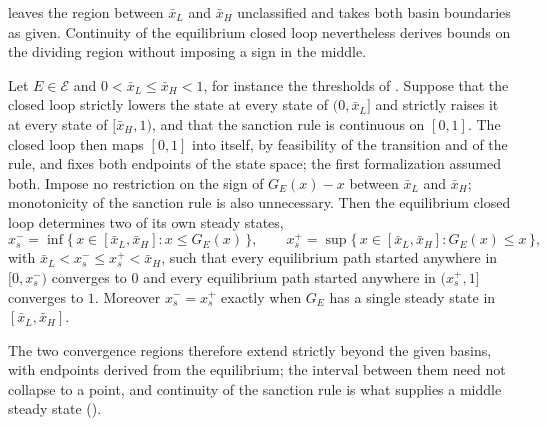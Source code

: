  leaves the region between $\bar x_L$ and
$\bar x_H$ unclassified and takes both basin boundaries as given. Continuity of
the equilibrium closed loop nevertheless derives bounds on the dividing region
without imposing a sign in the middle.

\begin{proposition}
\label{prop:derived-dividing-line}
Let $E\in\mathcal E$ and $0<\bar x_L\le\bar x_H<1$, for instance the thresholds
of . Suppose that the closed loop strictly
lowers the state at every state of $(0,\bar x_L]$ and strictly raises it at
every state of $[\bar x_H,1)$, and that the sanction rule is continuous on
$[0,1]$. The closed loop then maps $[0,1]$ into itself, by feasibility of the
transition and of the rule, and fixes both endpoints of the state space; the
first formalization assumed both. Impose no restriction on the sign
of $G_E(x)-x$ between $\bar x_L$ and $\bar x_H$; monotonicity of the sanction
rule is also unnecessary. Then the equilibrium
closed loop determines two of its own steady states,
\[
  x_s^-=\inf\{\,x\in[\bar x_L,\bar x_H]:x\le G_E(x)\,\},
  \qquad
  x_s^+=\sup\{\,x\in[\bar x_L,\bar x_H]:G_E(x)\le x\,\},
\]
with $\bar x_L<x_s^-\le x_s^+<\bar x_H$, such that every equilibrium path started
anywhere in $[0,x_s^-)$ converges to $0$ and every equilibrium path started
anywhere in $(x_s^+,1]$ converges to $1$. Moreover $x_s^-=x_s^+$ exactly when
$G_E$ has a single steady state in $[\bar x_L,\bar x_H]$.
\end{proposition}

The two convergence regions therefore extend strictly beyond the given basins,
with endpoints derived from the equilibrium; the interval between them need
not collapse to a point, and continuity of the sanction rule is what supplies
a middle steady state ().

